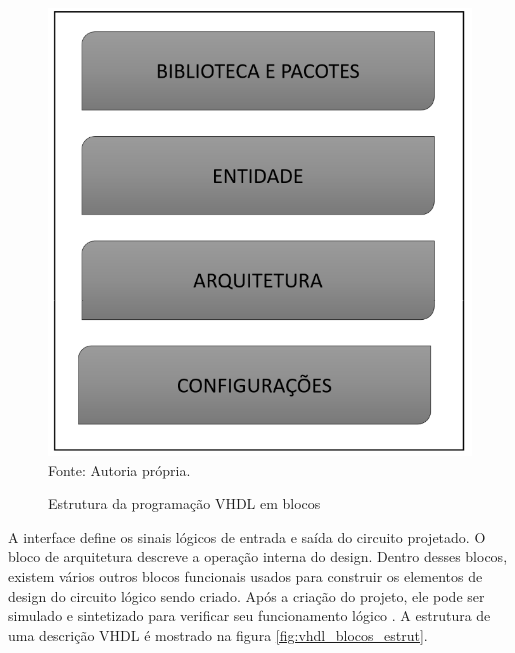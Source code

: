 \begin{figure}[!htb]
    \centering
    \caption{Estrutura da programação VHDL em blocos}
    \includegraphics[scale=0.37]{figuras/ESTR_VHDL.png}\\
    {\footnotesize Fonte: Autoria própria.}
    \label{fig:vhdl_blocos}
\end{figure}

A interface define os sinais lógicos de entrada e saída do circuito projetado. O bloco de arquitetura descreve a operação interna do design. Dentro desses blocos, existem vários outros blocos funcionais usados para construir os elementos de design do circuito lógico sendo criado. Após a criação do projeto, ele pode ser simulado e sintetizado para verificar seu funcionamento lógico \cite{ordonez2003projeto}. A estrutura de uma descrição VHDL é mostrado na figura \ref{fig:vhdl_blocos_estrut}.

